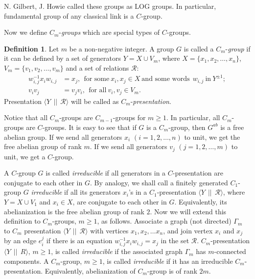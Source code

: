 \documentclass[11 pt, reqno]{amsart}
\theoremstyle{definition}
\newtheorem{definition}[theorem]{Definition}
\numberwithin{equation}{subsection}
\begin{document}
N. Gilbert, J. Howie \cite{GH-1} called these groups as LOG groups. In particular, fundamental group of  any classical link is a $C$-group.
\par

Now we define $C_m$-{\it groups} which are special types of $C$-groups.
\begin{definition}
Let $m$ be a non-negative integer. A  group $G$ is called a $C_m$-{\it group} if it can be defined by a set of generators $Y = X \cup V_m$, where
$X = \{ x_1, x_2, \ldots, x_n\}$, $V_m = \{ v_1, v_2, \ldots, v_m  \}$ and a set of relations $\mathcal{R}$:
\begin{align*}
w_{i,j}^{-1} x_i w_{i,j} &= x_j,~~\mbox{for some}~x_i, x_j  \in X ~\mbox{and some words}~~w_{i,j}~\mbox{in}~Y^{\pm 1};\\
v_i v_j &= v_j v_i,~~\mbox{for all}~v_i, v_j  \in V_m.
\end{align*}
Presentation $\langle Y~~||~~\mathcal{R} \rangle$ will be called as $C_m$-{\it presentation}.
\end{definition}

Notice that all $C_m$-groups are $C_{m-1}$-groups for $m \geq 1$. In particular, all $C_m$-groups are $C$-groups. It is easy to see that if $G$ is a $C_m$-group, then $G^{ab}$ is a free abelian group. If we send all generators $x_i$ $(i=1,2, \ldots,n)$ to unit, we get the  free abelian group of rank $m$. If we send all generators $v_j$ $(j=1,2, \ldots, m)$ to unit, we get a $C$-group.

A $C$-group $G$ is called {\it irreducible} if all generators in a $C$-presentation are conjugate to each other in $G$. By analogy, we shall call a finitely generated $C_1$-group $G$
{\it irreducible} if all its generators $x_i$'s in a $C_1$-presentation $\langle Y~~||~~\mathcal{R} \rangle$, where $Y=X \cup V_1$ and $x_i \in X$,  are conjugate to each other in $G$. Equivalently, its abelianization is the free abelian group of rank $2$. Now we will extend this definition to $C_m$-groups, $m \geq 1$, as follows. Associate a graph (not directed) $\Gamma_m$ to $C_m$ presentation $\langle Y~~||~~\mathcal{R} \rangle$ with vertices $x_1, x_2, \ldots x_n$, and join vertex $x_i$ and $x_j$ by an edge $e^{j}_{i}$ if there is an equation $w_{i,j}^{-1} x_iw_{i,j}=x_j$ in the set $\mathcal{R}$. $C_m$-presentation $\langle Y~~||~~R \rangle$, $m\geq 1$, is called {\it irreducible} if the associated graph $\Gamma_m$ has $m$-connected components. A $C_m$-group, $m \geq 1$, is called {\it irreducible} if it has an irreducible $C_m$-presentation. Equivalently, abelianization of $C_m$-group is of rank $2m$.
\par
\end{document}
